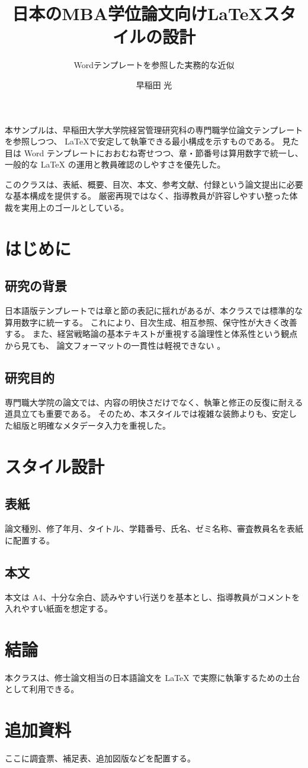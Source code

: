 \documentclass[degree-ja]{wbsmba}
\title{日本のMBA学位論文向けLaTeXスタイルの設計}
\subtitle{Wordテンプレートを参照した実務的な近似}
\author{早稲田 光}
\begin{document}
\maketitle

\begin{abstractpage}
本サンプルは、早稲田大学大学院経営管理研究科の専門職学位論文テンプレートを参照しつつ、
LaTeXで安定して執筆できる最小構成を示すものである。
見た目は Word テンプレートにおおむね寄せつつ、章・節番号は算用数字で統一し、
一般的な LaTeX の運用と教員確認のしやすさを優先した。

このクラスは、表紙、概要、目次、本文、参考文献、付録という論文提出に必要な基本構成を提供する。
厳密再現ではなく、指導教員が許容しやすい整った体裁を実用上のゴールとしている。
\end{abstractpage}

\wbsfrontmatter
\tableofcontents
\wbsmainmatter

\chapter{はじめに}
\section{研究の背景}
日本語版テンプレートでは章と節の表記に揺れがあるが、本クラスでは標準的な算用数字に統一する。
これにより、目次生成、相互参照、保守性が大きく改善する。
また、経営戦略論の基本テキストが重視する論理性と体系性という観点から見ても、
論文フォーマットの一貫性は軽視できない \cite{kawai2012dynamic,otaki2016keieisenryaku}。

\section{研究目的}
専門職大学院の論文では、内容の明快さだけでなく、執筆と修正の反復に耐える道具立ても重要である。
そのため、本スタイルでは複雑な装飾よりも、安定した組版と明確なメタデータ入力を重視した。

\chapter{スタイル設計}
\section{表紙}
論文種別、修了年月、タイトル、学籍番号、氏名、ゼミ名称、審査教員名を表紙に配置する。

\section{本文}
本文は A4、十分な余白、読みやすい行送りを基本とし、指導教員がコメントを入れやすい紙面を想定する。

\chapter{結論}
本クラスは、修士論文相当の日本語論文を LaTeX で実際に執筆するための土台として利用できる。




\appendix
\chapter{追加資料}
ここに調査票、補足表、追加図版などを配置する。
\end{document}
